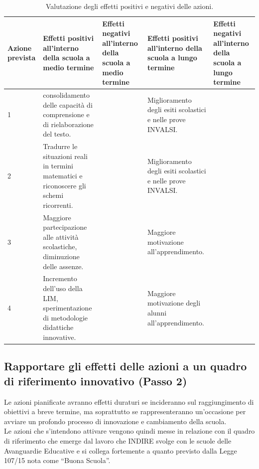 \documentclass[12pt,a4paper,oneside]{memoir}
\begin{document}
\begin{table}[htp]
\caption{Valutazione degli effetti positivi e negativi delle azioni.}  \label{valutazioni-effetti-azioni}
\footnotesize
\begin{tabular}{|>{\raggedright}p{1.902cm}|>{\raggedright}p{2.337cm}|>{\raggedright}p{2.337cm}|>{\raggedright}p{2.337cm}|>{\raggedright\arraybackslash}p{2.337cm}|}
\hline
\rowcolor{violetto}
Azione prevista&Effetti positivi all'interno della scuola a medio termine&Effetti negativi all'interno della scuola a medio termine&Effetti positivi all'interno della scuola a lungo termine&Effetti negativi all'interno della scuola a lungo termine\\ \hline
1&con\-so\-li\-da\-men\-to delle capacità di comprensione e di rielaborazione del testo.&&Mi\-glio\-ra\-men\-to degli esiti scolastici e nelle prove INVALSI.&\\ \hline
2&Tradurre le situazioni reali in termini matematici e riconoscere gli schemi ricorrenti.&&Mi\-glio\-ra\-men\-to degli esiti scolastici e nelle prove INVALSI.&\\ \hline
3&Maggiore partecipazione alle attività scolastiche, diminuzione delle assenze.&&Maggiore motivazione all'apprendimento.&\\ \hline
4&Incremento dell'uso della LIM, sperimentazione di metodologie didattiche innovative.&&Maggiore motivazione degli alunni all'apprendimento.&\\ \hline	
\end{tabular}
\end{table}

\clearpage

\subsection[Passo 2. Rapportare gli effetti a un quadro di riferimento innovativo]{Rapportare gli effetti delle azioni a un quadro di riferimento innovativo (Passo 2)}

Le azioni pianificate avranno effetti duraturi se incideranno sul raggiungimento di obiettivi a breve termine, ma soprattutto se rappresenteranno un'occasione per avviare un profondo processo di innovazione e cambiamento della scuola.\\

Le azioni che s'intendono attivare vengono quindi messe in relazione con il quadro di riferimento che emerge dal lavoro che INDIRE svolge con le scuole delle Avanguardie Educative e si collega fortemente a quanto previsto dalla Legge 107/15 nota come ``Buona Scuola''.\\
\end{document}
